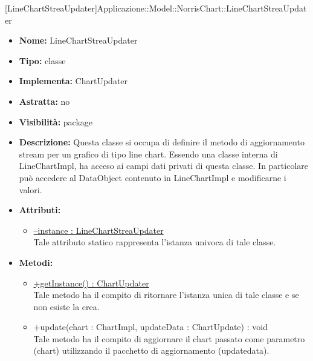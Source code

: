 			
			[LineChartStreaUpdater]{Applicazione::Model::NorrisChart::LineChartStreaUpdater}
			

	
			
			\begin{itemize}
			\item \textbf{Nome:} LineChartStreaUpdater
			\item \textbf{Tipo:} classe
			
		\item \textbf{Implementa:}
		ChartUpdater
		\item \textbf{Astratta:}
		no
			\item \textbf{Visibilità:} package
			\item \textbf{Descrizione:} Questa classe si occupa di definire il metodo di aggiornamento stream per un grafico di tipo line chart. Essendo una classe interna di LineChartImpl, ha acceso ai campi dati privati di questa classe. In particolare può accedere al DataObject contenuto in LineChartImpl e modificarne i valori.
			\item \textbf{Attributi:}
				\begin{itemize}
				\setlength{\itemsep}{5pt}
				
					\item[\ding{111}] \underline{--instance : LineChartStreaUpdater} \\ [1mm] Tale attributo statico rappresenta l'istanza univoca di tale classe.
				\end{itemize}
		
			\item \textbf{Metodi:}
				\begin{itemize}
				\setlength{\itemsep}{5pt}
				
					\item[\ding{111}] {\underline{+getInstance() : ChartUpdater}} \\ [1mm] Tale metodo ha il compito di ritornare l'istanza unica di tale classe e se non esiste la crea.
					\item[\ding{111}] {{+update(chart : ChartImpl, updateData : ChartUpdate) : void}} \\ [1mm] Tale metodo ha il compito di aggiornare il chart passato come parametro (chart) utilizzando il pacchetto di aggiornamento (updatedata).
				\end{itemize}
		
			\end{itemize}

